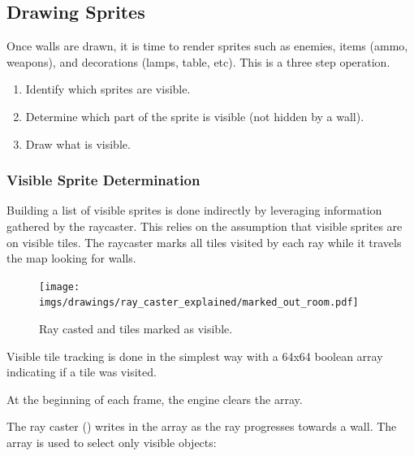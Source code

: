 \subsection{Drawing Sprites}
\label{drawingSprites}
Once walls are drawn, it is time to render sprites such as enemies, items (ammo, weapons), and decorations (lamps, table, etc). This is a three step operation.
 \begin{enumerate}
  \item Identify which sprites are visible.
  \item Determine which part of the sprite is visible (not hidden by a wall).
  \item Draw what is visible.
 \end{enumerate}



\subsubsection{Visible Sprite Determination}
Building a list of visible sprites is done indirectly by leveraging information gathered by the raycaster. This relies on the assumption that visible sprites are on visible tiles. The raycaster marks all tiles visited by each ray while it travels the map looking for walls.\\
\begin{figure}[H]
  \centering
  \texttt{[image: imgs/drawings/ray\_caster\_explained/marked\_out\_room.pdf]}
 \caption{Ray casted and tiles marked as visible.} 
\end{figure}
Visible tile tracking is done in the simplest way with a 64x64 boolean array indicating if a tile was visited.\\
\par
\par
\begin{minipage}{\textwidth}
  
\end{minipage}
\par

 At the beginning of each frame, the engine clears the array.\\
\par
\begin{minipage}{\textwidth}
 
 \end{minipage}
 \par
The ray caster () writes  in the  array as the ray progresses towards a wall. The array is used to select only visible objects:\\
\par

